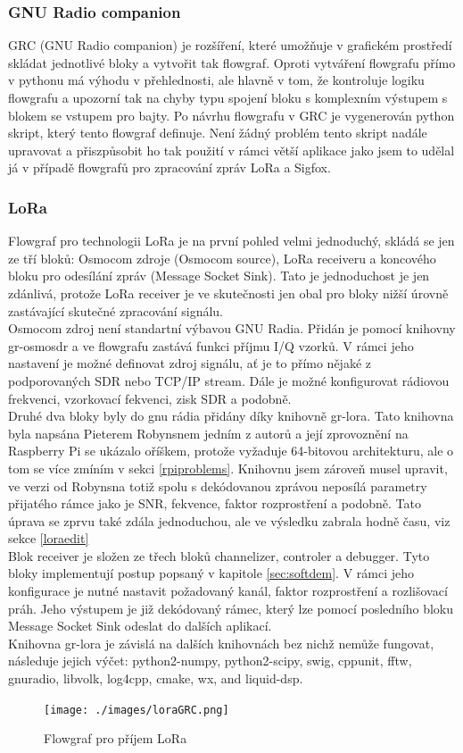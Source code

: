 \documentclass{ctuthesis}
\begin{document}
\subsubsection{GNU Radio companion}
GRC (GNU Radio companion) je rozšíření, které umožňuje v grafickém prostředí skládat jednotlivé bloky a vytvořit tak flowgraf. Oproti vytváření flowgrafu přímo v pythonu má výhodu v přehlednosti, ale hlavně v tom, že kontroluje logiku flowgrafu a upozorní tak na chyby typu spojení bloku s komplexním výstupem s blokem se vstupem pro bajty. Po návrhu flowgrafu v GRC je vygenerován python skript, který tento flowgraf definuje. Není žádný problém tento skript nadále upravovat a přiszpůsobit ho tak použití v rámci větší aplikace jako jsem to udělal já v případě flowgrafů pro zpracování zpráv LoRa a Sigfox.

\subsubsection{LoRa}
Flowgraf pro technologii LoRa je na první pohled velmi jednoduchý, skládá se jen ze tří bloků: Osmocom zdroje (Osmocom source), LoRa receiveru a koncového bloku pro odesílání zpráv (Message Socket Sink). Tato je jednoduchost je jen zdánlivá, protože LoRa receiver je ve skutečnosti jen obal pro bloky nižší úrovně zastávající skutečné zpracování signálu. \\
Osmocom zdroj není standartní výbavou GNU Radia. Přidán je pomocí knihovny gr-osmosdr a ve flowgrafu zastává funkci příjmu I/Q vzorků. V rámci jeho nastavení je možné definovat zdroj signálu, ať je to přímo nějaké z podporovaných SDR nebo TCP/IP stream. Dále je možné konfigurovat rádiovou frekvenci, vzorkovací fekvenci, zisk SDR a podobně. \\
Druhé dva bloky byly do gnu rádia přidány díky knihovně gr-lora\cite{pieterrobynson}. Tato knihovna byla napsána Pieterem Robynsnem jedním z autorů \cite{gr-lora2018} a její zprovoznění na Raspberry Pi se ukázalo oříškem, protože vyžaduje 64-bitovou architekturu, ale o tom se více zmíním v sekci \ref{rpiproblems}. Knihovnu jsem zároveň musel upravit, ve verzi od Robynsna totiž spolu s dekódovanou zprávou neposílá parametry přijatého rámce jako je SNR, fekvence, faktor rozprostření a podobně. Tato úprava se zprvu také zdála jednoduchou, ale ve výsledku zabrala hodně času, viz sekce \ref{loraedit}\\
Blok receiver je složen ze třech bloků channelizer, controler a debugger. Tyto bloky implementují postup popsaný v kapitole \ref{sec:softdem}. V rámci jeho konfigurace je nutné nastavit požadovaný kanál, faktor rozprostření a rozlišovací práh. Jeho výstupem je již dekódovaný rámec, který lze pomocí posledního bloku Message Socket Sink odeslat do dalších aplikací.\\
Knihovna gr-lora je závislá na dalších knihovnách bez nichž nemůže fungovat, následuje jejich výčet: python2-numpy, python2-scipy, swig, cppunit, fftw, gnuradio, libvolk, log4cpp, cmake, wx, and liquid-dsp. \cite{pieterrobynson}
\begin{figure}
\caption{Flowgraf pro příjem LoRa}
\texttt{[image: ./images/loraGRC.png]}
\label{loraGRC}
\end{figure}
\end{document}

